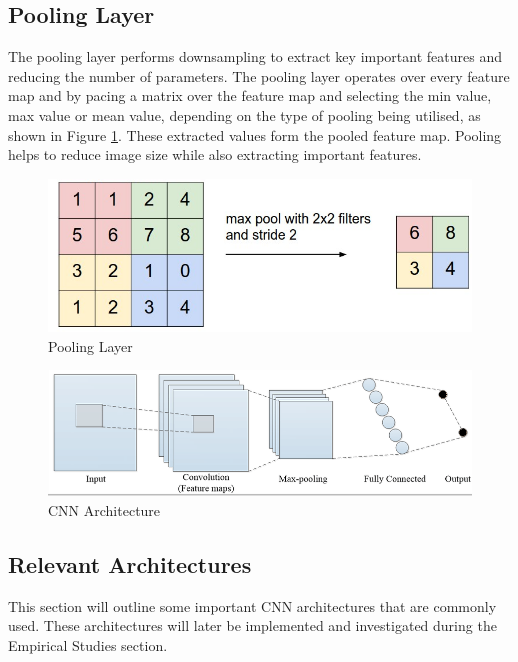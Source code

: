 \documentclass[12pt]{report}
\begin{document}
\newpage
\subsection{Pooling Layer}
\begin{flushleft}
The pooling layer performs downsampling to extract key important features and reducing the number of parameters. The pooling layer operates over every feature map and by pacing a matrix over the feature map and selecting the min value, max value or mean value, depending on the type of pooling being utilised, as shown in Figure \ref{fig:pool}. These extracted values form the pooled feature map. Pooling helps to reduce image size while also extracting important features.
\end{flushleft}

\vspace{0.5cm}
\begin{figure}[ht!]
	\centering
	\includegraphics[width=12cm]{pool}
	\caption{Pooling Layer}
	\label{fig:pool}
\end{figure}

\vspace{0.5cm}
\begin{figure}[ht!]
	\centering
	\includegraphics[width=12cm]{convo}
	\caption{CNN Architecture}
	\label{fig:convo}
\end{figure}

\newpage
\subsection{Relevant Architectures}
\begin{flushleft}
This section will outline some important CNN architectures that are commonly used. These architectures will later be implemented and investigated during the Empirical Studies section.
\end{flushleft}
\end{document}
